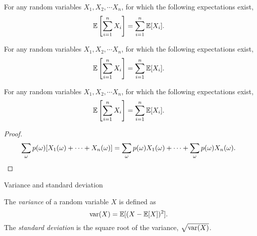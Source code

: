 \begin{note}
  \begin{field}
    \begin{thm}
      For any random variables $X_1, X_2, \cdots X_n$, for which the following expectations exist,
      \[
        \mathbb{E}\left[\sum_{i = 1}^n X_i\right] = \sum_{i = 1}^n \mathbb{E}[X_i].
      \]
    \end{thm}
  \end{field}
  \begin{field}
    \begin{thm}
      For any random variables $X_1, X_2, \cdots X_n$, for which the following expectations exist,
      \[
        \mathbb{E}\left[\sum_{i = 1}^n X_i\right] = \sum_{i = 1}^n \mathbb{E}[X_i].
      \]
    \end{thm}
  \end{field}
  \xplain{}%
\end{note}

%
\begin{note}
  \begin{field}
    \begin{thm}
      For any random variables $X_1, X_2, \cdots X_n$, for which the following expectations exist,
      \[
        \mathbb{E}\left[\sum_{i = 1}^n X_i\right] = \sum_{i = 1}^n \mathbb{E}[X_i].
      \]
    \end{thm}
  \end{field}
  \begin{field}
    \begin{proof}
      \[
        \sum_\omega p(\omega)[X_1(\omega) + \cdots + X_n(\omega)] = \sum_\omega p(\omega)X_1(\omega) + \cdots + \sum_\omega p(\omega) X_n(\omega).\qedhere
      \]
    \end{proof}
  \end{field}
  \xplain{}%
\end{note}

%
\begin{note}
  \begin{field}
    Variance and standard deviation
  \end{field}
  \begin{field}
    \begin{defi}
      The \emph{variance} of a random variable $X$ is defined as
      \[
        \operatorname{var}(X) = \mathbb{E}[(X - \mathbb{E}[X])^2].
      \]
      The \emph{standard deviation} is the square root of the variance, $\sqrt{\operatorname{var}(X)}$.
    \end{defi}
  \end{field}
  \xplain{}%
\end{note}

